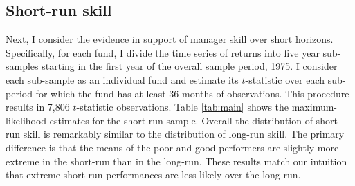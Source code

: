 	\subsection{Short-run skill}
		Next, I consider the evidence in support of manager skill over short horizons. Specifically, for each fund, I divide the time series of returns into five year sub-samples starting in the first year of the overall sample period, 1975. I consider each sub-sample as an individual fund and estimate its $t$-statistic over each sub-period for which the fund has at least 36 months of observations. This procedure results in 7,806 $t$-statistic observations. Table \ref{tab:main} shows the maximum-likelihood estimates for the short-run sample. Overall the distribution of short-run skill is remarkably similar to the distribution of long-run skill. The primary difference is that the means of the poor and good performers are slightly more extreme in the short-run than in the long-run. These results match our intuition that extreme short-run performances are less likely over the long-run.

